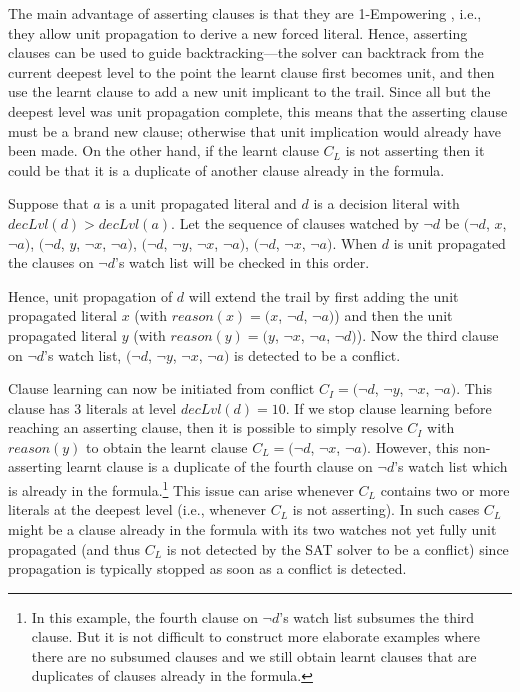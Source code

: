\documentclass[runningheads]{llncs}
\newcommand{\sat}{SAT\xspace}
\newcommand{\dlevel}[1]{\ensuremath{\mathit{decLvl}(#1)}}
\newcommand{\reason}[1]{\ensuremath{\mathit{reason}(#1)}}
\begin{document}
The main advantage of asserting clauses is that they are 1-Empowering
\cite{DBLP:journals/ai/PipatsrisawatD11}, i.e., they allow unit
propagation to derive a new forced literal. Hence, asserting clauses
can be used to guide backtracking---the solver can backtrack from the
current deepest level to the point the learnt clause first becomes
unit, and then use the learnt clause to add a new unit implicant to
the trail. Since all but the deepest level was unit propagation
complete, this means that the asserting clause must be a brand new
clause; otherwise that unit implication would already have been
made. On the other hand, if the learnt clause $C_L$ is not asserting
then it could be that it is a duplicate of another clause already in
the formula.

\begin{example}
    Suppose that $a$ is a unit propagated literal and $d$ is a
    decision literal with $\dlevel{d}>\dlevel{a}$. Let the sequence of
    clauses watched by $\lnot d$ be $(\lnot d$, $x$, $\lnot a)$,
    $(\lnot d$, $y$, $\lnot x$, $\lnot a)$, $(\lnot d$, $\lnot y$,
    $\lnot x$, $\lnot a)$, $(\lnot d$, $\lnot x$, $\lnot a)$. When $d$
    is unit propagated the clauses on $\lnot d$'s watch list will be
    checked in this order.

    Hence, unit propagation of $d$ will extend the trail by first
    adding the unit propagated literal $x$ (with $\reason{x}=(x$,
    $\lnot d$, $\lnot a)$) and then the unit propagated literal $y$
    (with $\reason{y}=(y$, $\lnot x$, $\lnot a$, $\lnot d)$). Now the
    third clause on $\lnot d$'s watch list, $(\lnot d$, $\lnot y$,
    $\lnot x$, $\lnot a)$ is detected to be a conflict. 

    Clause learning can now be initiated from conflict $C_I=(\lnot d$,
    $\lnot y$, $\lnot x$, $\lnot a)$. This clause has 3 literals at
    level $\dlevel{d}=10$. If we stop clause learning before reaching
    an asserting clause, then it is possible to simply resolve $C_I$
    with $\reason{y}$ to obtain the learnt clause $C_L = (\lnot d$,
    $\lnot x$, $\lnot a)$. However, this non-asserting learnt clause
    is a duplicate of the fourth clause on $\lnot d$'s watch list
    which is already in the formula.\footnote{In this example, the
      fourth clause on $\lnot d$'s watch list subsumes the third
      clause. But it is not difficult to construct more elaborate
      examples where there are no subsumed clauses and we still obtain
      learnt clauses that are duplicates of clauses already in the
      formula.}  This issue can arise whenever $C_L$ contains two or
    more literals at the deepest level (i.e., whenever $C_L$ is not
    asserting). In such cases $C_L$ might be a clause already in the
    formula with its two watches not yet fully unit propagated (and
    thus $C_L$ is not detected by the \sat solver to be a conflict)
    since propagation is typically stopped as soon as a conflict is
    detected.

\end{example}
\end{document}
